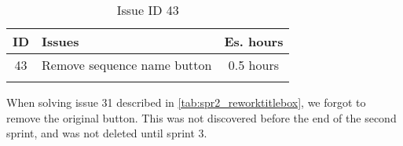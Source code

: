 \begin{longtable} { | c | p{12cm} | c | } 
\hline
	ID 	&	Issues	&		 Es. hours \\\hline
	43	&	Remove sequence name button		&	0.5 hours \\\hline
\caption{Issue ID 43}
\label{tab:spr3_removeeditnamebutton}
\end{longtable}

When solving issue 31 described in \ref{tab:spr2_reworktitlebox}, we forgot to remove the original button. This was not discovered before the end of the second sprint, and was not deleted until sprint 3.